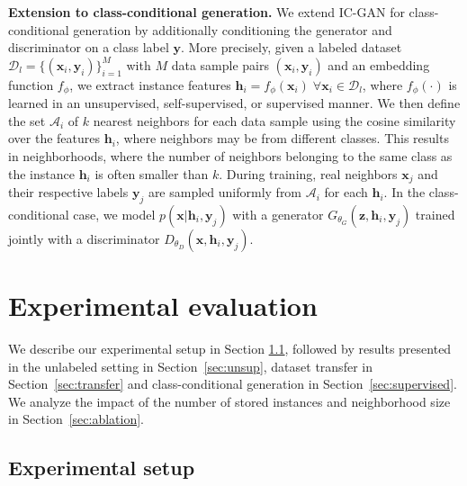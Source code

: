 \textbf{Extension to class-conditional generation.} We extend {IC-GAN} for class-conditional generation by additionally conditioning the generator and discriminator on a class label $\mathbf{y}$. 
More precisely, given a labeled dataset $\mathcal{D}_l = \{(\mathbf{x}_i, \mathbf{y}_i)\}_{i=1}^M$ with $M$ data sample pairs $(\mathbf{x}_i, \mathbf{y}_i)$ and an embedding function $f_\phi$, we  extract instance features $\mathbf{h}_i=f_{\phi}(\mathbf{x}_i) \; \forall \mathbf{x}_i \in \mathcal{D}_l$, where $f_{\phi}(\cdot)$ is learned in an unsupervised, self-supervised, or supervised manner. We then define the set $\mathcal{A}_i$ of $k$ nearest neighbors for each data sample using the cosine similarity over the features $\mathbf{h}_i$, where neighbors may be from different classes. This results in neighborhoods, where the number of neighbors belonging to the same class as the instance $\mathbf{h}_i$ is often smaller than $k$. During training, real neighbors $\mathbf{x}_j$ and their respective labels $\mathbf{y}_j$ are sampled uniformly from $\mathcal{A}_i$ for each $\mathbf{h}_i$.
In the class-conditional case, we model $p(\mathbf{x}|\mathbf{h}_i, \mathbf{y}_j)$ with a generator $G_{\theta_G}(\mathbf{z}, \mathbf{h}_i, \mathbf{y}_j)$ trained jointly with a discriminator $D_{\theta_D}(\mathbf{x},\mathbf{h}_i, \mathbf{y}_j)$.

\section{Experimental evaluation}

We describe our experimental setup in Section \ref{sec:setup}, followed by results presented in the unlabeled setting in Section~\ref{sec:unsup}, dataset transfer in Section~\ref{sec:transfer} and class-conditional generation  in Section~\ref{sec:supervised}.
We  analyze the impact of the number of stored instances and neighborhood size in 
Section~\ref{sec:ablation}.

\subsection{Experimental setup}
\label{sec:setup}


